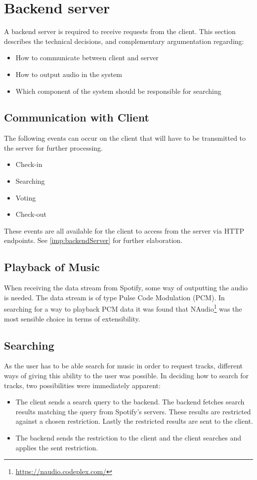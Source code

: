 \section{Backend server}
\label{techPlat:backendServer}

A backend server is required to receive requests from the client. This section describes the technical decisions, and complementary argumentation regarding:
\begin{itemize}
  \item How to communicate between client and server
  \item How to output audio in the system
  \item Which component of the system should be responsible for searching
\end{itemize}

\subsection{Communication with Client}
The following events can occur on the client that will have to be
transmitted to the server for further processing.

\begin{itemize}
\item Check-in
\item Searching
\item Voting
\item Check-out
\end{itemize}

These events are all available for the client to access from the server
via HTTP endpoints. See \cref{imp:backendServer} for further elaboration.

\subsection{Playback of Music}
When receiving the data stream from Spotify, some way of outputting the audio is needed. The data stream is of type Pulse Code Modulation (PCM). In searching for a way to playback PCM data it was found that NAudio\footnote{\url{https://naudio.codeplex.com/}} was the most sensible choice in terms of extensibility.

\subsection{Searching}
As the user has to be able search for music in order to request tracks, different ways of giving this ability to the user was possible. In deciding how to search for tracks, two possibilities were immediately apparent:
\begin{itemize}
  \item The client sends a search query to the backend. The backend fetches search results matching the query from Spotify's servers. These results are restricted against a chosen restriction. Lastly the restricted results are sent to the client.
  \item The backend sends the restriction to the client and the client searches and applies the sent restriction.
\end{itemize}

